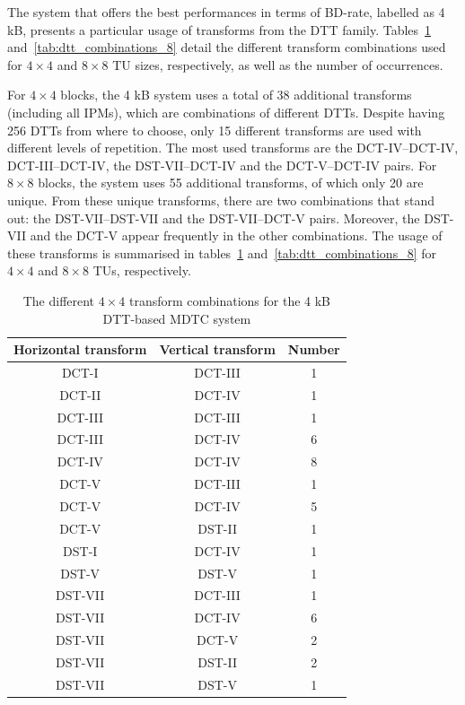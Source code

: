 \documentclass[11pt,a4paper,openright,twoside]{book}
\numberwithin{equation}{section} %
\numberwithin{figure}{section} %
\numberwithin{table}{section} %
\begin{document}
The system that offers the best performances in terms of \acs{BD}-rate,
labelled as 4 kB, presents a particular usage of transforms from the \ac{DTT}
family.
Tables~\ref{tab:dtt_combinations_4} and~\ref{tab:dtt_combinations_8} detail
the different transform combinations used for $4\times4$ and $8\times8$
\ac{TU} sizes, respectively, as well as the number of occurrences.

For $4\times4$ blocks, the 4 kB system uses a total of 38 additional
transforms (including all \acp{IPM}), which are combinations of different
\acp{DTT}.
Despite having 256 \acp{DTT} from where to choose, only 15 different
transforms are used with different levels of repetition.
The most used transforms are the \acs{DCT}-IV--\acs{DCT}-IV,
\acs{DCT}-III--\acs{DCT}-IV, the \acs{DST}-VII--\acs{DCT}-IV and the
\acs{DCT}-V--\acs{DCT}-IV pairs.
For $8\times8$ blocks, the system uses 55 additional transforms, of which only
20 are unique.
From these unique transforms, there are two combinations that stand out: the
\acs{DST}-VII--\acs{DST}-VII and the \acs{DST}-VII--\acs{DCT}-V pairs.
Moreover, the \acs{DST}-VII and the \acs{DCT}-V appear frequently in the
other combinations.
The usage of these transforms is summarised  in
tables~\ref{tab:dtt_combinations_4} and~\ref{tab:dtt_combinations_8} for
$4\times4$ and $8\times8$ \acp{TU}, respectively.

\begin{table}[tb]
	\centering
	\small
	\begin{tabular}{cc|c}
		Horizontal transform & Vertical transform & Number \\
		\hline\hline
		DCT-I   & DCT-III & 1 \\
		DCT-II  & DCT-IV  & 1 \\
		DCT-III & DCT-III & 1 \\
		DCT-III & DCT-IV  & 6 \\
		DCT-IV  & DCT-IV  & 8 \\
		DCT-V   & DCT-III & 1 \\
		DCT-V   & DCT-IV  & 5 \\
		DCT-V   & DST-II  & 1 \\
		DST-I   & DCT-IV  & 1 \\
		DST-V   & DST-V   & 1 \\
		DST-VII & DCT-III & 1 \\
		DST-VII & DCT-IV  & 6 \\
		DST-VII & DCT-V   & 2 \\
		DST-VII & DST-II  & 2 \\
		DST-VII & DST-V   & 1 \\
	\end{tabular}
	\caption{The different $4\times4$ transform combinations for the 4
	kB \acs{DTT}-based \acs{MDTC} system}
	\label{tab:dtt_combinations_4}
\end{table}
\end{document}
